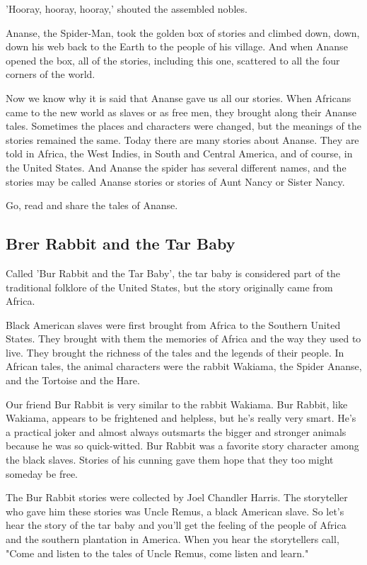 'Hooray, hooray, hooray,' shouted the assembled nobles.

Ananse, the Spider-Man, took the golden box of stories and climbed down, down, down his web back to the Earth to the people of his village. And when Ananse opened the box, all of the stories, including this one, scattered to all the four corners of the world.

Now we know why it is said that Ananse gave us all our stories. When Africans came to the new world as slaves or as free men, they brought along their Ananse tales. Sometimes the places and characters were changed, but the meanings of the stories remained the same. Today there are many stories about Ananse. They are told in Africa, the West Indies, in South and Central America, and of course, in the United States. And Ananse the spider has several different names, and the stories may be called Ananse stories or stories of Aunt Nancy or Sister Nancy.

Go, read and share the tales of Ananse.

\subsection{Brer Rabbit and the Tar Baby}

Called 'Bur Rabbit and the Tar Baby', the tar baby is considered part of the traditional folklore of the United States, but the story originally came from Africa.

Black American slaves were first brought from Africa to the Southern United States. They brought with them the memories of Africa and the way they used to live. They brought the richness of the tales and the legends of their people. In African tales, the animal characters were the rabbit Wakiama, the Spider Ananse, and the Tortoise and the Hare.

Our friend Bur Rabbit is very similar to the rabbit Wakiama. Bur Rabbit, like Wakiama, appears to be frightened and helpless, but he's really very smart. He's a practical joker and almost always outsmarts the bigger and stronger animals because he was so quick-witted. Bur Rabbit was a favorite story character among the black slaves. Stories of his cunning gave them hope that they too might someday be free.

The Bur Rabbit stories were collected by Joel Chandler Harris. The storyteller who gave him these stories was Uncle Remus, a black American slave. So let's hear the story of the tar baby and you'll get the feeling of the people of Africa and the southern plantation in America. When you hear the storytellers call, "Come and listen to the tales of Uncle Remus, come listen and learn."

